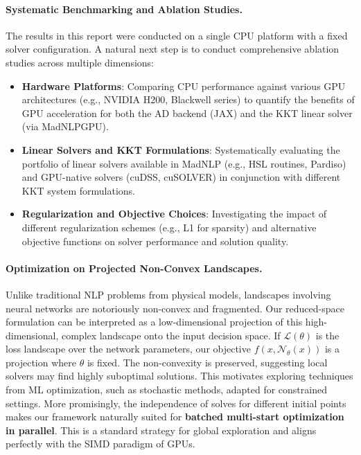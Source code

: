 \documentclass[11pt]{article}
\begin{document}
\paragraph{Systematic Benchmarking and Ablation Studies.}
The results in this report were conducted on a single CPU platform with a fixed solver configuration. A natural next step is to conduct comprehensive ablation studies across multiple dimensions:
\begin{itemize}[leftmargin=1.5em]
    \item \textbf{Hardware Platforms}: Comparing CPU performance against various GPU architectures (e.g., NVIDIA H200, Blackwell series) to quantify the benefits of GPU acceleration for both the AD backend (JAX) and the KKT linear solver (via MadNLPGPU).
    \item \textbf{Linear Solvers and KKT Formulations}: Systematically evaluating the portfolio of linear solvers available in MadNLP (e.g., HSL routines, Pardiso) and GPU-native solvers (cuDSS, cuSOLVER) in conjunction with different KKT system formulations.
    \item \textbf{Regularization and Objective Choices}: Investigating the impact of different regularization schemes (e.g., L1 for sparsity) and alternative objective functions on solver performance and solution quality.
\end{itemize}

\paragraph{Optimization on Projected Non-Convex Landscapes.}
Unlike traditional NLP problems from physical models, landscapes involving neural networks are notoriously non-convex and fragmented. Our reduced-space formulation can be interpreted as a low-dimensional projection of this high-dimensional, complex landscape onto the input decision space. If $\mathcal{L}(\theta)$ is the loss landscape over the network parameters, our objective $f(x, \mathcal{N}_\theta(x))$ is a projection where $\theta$ is fixed. The non-convexity is preserved, suggesting local solvers may find highly suboptimal solutions. This motivates exploring techniques from ML optimization, such as stochastic methods, adapted for constrained settings. More promisingly, the independence of solves for different initial points makes our framework naturally suited for \textbf{batched multi-start optimization in parallel}. This is a standard strategy for global exploration and aligns perfectly with the SIMD paradigm of GPUs.
\end{document}
